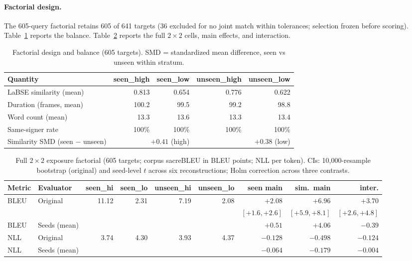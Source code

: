 \documentclass[pdflatex,sn-chicago]{sn-jnl}
\begin{document}
\paragraph{Factorial design.}
The 605-query factorial retains 605 of 641 targets (36 excluded for no joint match within tolerances; selection frozen before scoring). Table~\ref{tab:factorial_design} reports the balance. Table~\ref{tab:factorial_full} reports the full $2\times2$ cells, main effects, and interaction.

\begin{table}[h]
\centering
\small
\caption{Factorial design and balance (605 targets). SMD = standardized mean difference, seen vs unseen within stratum.}
\label{tab:factorial_design}
\begin{tabular}{lrrrr}
\toprule
Quantity & seen\_high & seen\_low & unseen\_high & unseen\_low \\
\midrule
LaBSE similarity (mean) & 0.813 & 0.654 & 0.776 & 0.622 \\
Duration (frames, mean) & 100.2 & 99.5 & 99.2 & 98.8 \\
Word count (mean) & 13.3 & 13.6 & 13.3 & 13.4 \\
Same-signer rate & 100\% & 100\% & 100\% & 100\% \\
\midrule
Similarity SMD (seen $-$ unseen) & \multicolumn{2}{r}{$+0.41$ (high)} & \multicolumn{2}{r}{$+0.38$ (low)} \\
\bottomrule
\end{tabular}
\end{table}

\begin{table}[h]
\centering
\scriptsize\setlength{\tabcolsep}{3pt}
\caption{Full $2\times2$ exposure factorial (605 targets; corpus sacreBLEU in BLEU points; NLL per token). CIs: 10{,}000-resample bootstrap (original) and seed-level $t$ across six reconstructions; Holm correction across three contrasts.}
\label{tab:factorial_full}
\begin{tabular}{llrrrrrrr}
\toprule
Metric & Evaluator & seen\_hi & seen\_lo & unseen\_hi & unseen\_lo & seen main & sim.\ main & inter. \\
\midrule
BLEU & Original & 11.12 & 2.31 & 7.19 & 2.08 & $\mathbf{+2.08}$ & $+6.96$ & $\mathbf{+3.70}$ \\
 &  &  &  &  &  & $[+1.6,+2.6]$ & $[+5.9,+8.1]$ & $[+2.6,+4.8]$ \\
BLEU & Seeds (mean) &  &  &  &  & $+0.51$ & $+4.06$ & $-0.39$ \\
\midrule
NLL & Original & 3.74 & 4.30 & 3.93 & 4.37 & $-0.128$ & $-0.498$ & $-0.124$ \\
NLL & Seeds (mean) &  &  &  &  & $-0.064$ & $-0.179$ & $-0.004$ \\
\bottomrule
\end{tabular}
\end{table}
\end{document}
